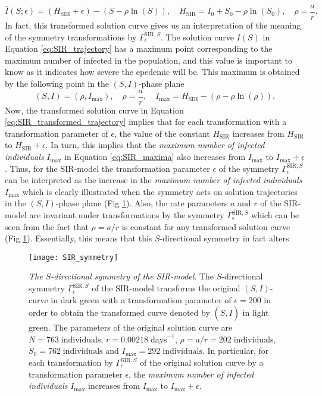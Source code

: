 \begin{equation}
\hat{I}(S;\epsilon)=(H_{\mathrm{SIR}}+\epsilon)-(S-\rho\ln(S)),\quad H_{\mathrm{SIR}}=I_0+S_0-\rho\ln(S_0),\quad\rho=\dfrac{a}{r}.
  \label{eq:SIR_transformed_trajectory}
\end{equation}
In fact, this transformed solution curve gives us an interpretation of the meaning of the symmetry transformations by $\Gamma^{\mathrm{SIR},S}_\epsilon$. The solution curve $I(S)$ in Equation \eqref{eq:SIR_trajectory} has a maximum point corresponding to the maximum number of infected in the population, and this value is important to know as it indicates how severe the epedemic will be. This maximum is obtained by the following point in the $(S,I)$-phase plane \cite{murray2002}
\begin{equation}
    (S,I)=(\rho,I_{\max}),\quad\rho=\dfrac{a}{r},\quad I_{\max}=H_{\mathrm{SIR}}-\left(\rho-\rho\ln\left(\rho\right)\right).
\label{eq:SIR_maxima}
  \end{equation}
Now, the transformed solution curve in Equation \eqref{eq:SIR_transformed_trajectory} implies that for each transformation with a transformation parameter of $\epsilon$, the value of the constant $H_{\mathrm{SIR}}$ increases from $H_{\mathrm{SIR}}$ to $H_{\mathrm{SIR}}+\epsilon$. In turn, this implies that the \textit{maximum number of infected individuals} $I_{\max}$ in Equation \eqref{eq:SIR_maxima} also increases from $I_{\max}$ to $I_{\max}+\epsilon$. Thus, for the SIR-model the transformation parameter $\epsilon$ of the symmetry $\Gamma^{\mathrm{SIR},S}_{\epsilon}$ can be interpreted as the increase in the \textit{maximum number of infected individuals} $I_{\max}$ which is clearly illustrated when the symmetry acts on solution trajectories in the $(S,I)$-phase plane (Fig \ref{fig:SIR_symmetry}). Also, the rate parameters $a$ and $r$ of the SIR-model are invariant under transformations by the symmetry $\Gamma^{\mathrm{SIR},S}_{\epsilon}$ which can be seen from the fact that $\rho=a/r$ is constant for any transformed solution curve (Fig \ref{fig:SIR_symmetry}). Essentially, this means that this $S$-directional symmetry in fact alters 


\begin{figure}[htbp!]
  \begin{center}
\texttt{[image: SIR\_symmetry]}
\caption{\textit{The $S$-directional symmetry of the SIR-model}. The $S$-directional symmetry $\Gamma^{\mathrm{SIR},S}_{\epsilon}$ of the SIR-model transforms the original $(S,I)$-curve in dark green with a transformation parameter of $\epsilon=200$ in order to obtain the transformed curve denoted by $(\hat{S},I)$ in light green. The parameters of the original solution curve are $N=763\;\mathrm{individuals}$, $r=0.00218\;\mathrm{days}^{-1}$, $\rho=a/r=202\;\mathrm{individuals}$, $S_0=762\;\mathrm{individuals}$ and $I_{\max}=292\;\mathrm{individuals}$. In particular, for each transformation by $\Gamma^{\mathrm{SIR},S}_{\epsilon}$ of the original solution curve by a transformation parameter $\epsilon$, the \textit{maximum number of infected individuals} $I_{\max}$ increases from $I_{\max}$ to $I_{\max}+\epsilon$. }
\label{fig:SIR_symmetry}
\end{center}
\end{figure}


